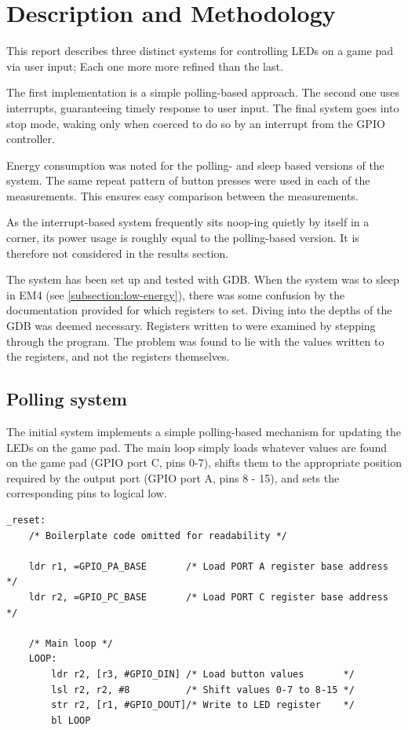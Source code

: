 \section{Description and Methodology}

This report describes three distinct systems for controlling LEDs on a game pad via user input; Each one more more refined than the last.

The first implementation is a simple polling-based approach. The second one uses interrupts, guaranteeing timely response to user input. The final system goes into stop mode, waking only when coerced to do so by an interrupt from the GPIO controller.

Energy consumption was noted for the polling- and sleep based versions of the system. The same repeat pattern of button presses were used in each of the measurements. This ensures easy comparison between the measurements.

As the interrupt-based system frequently sits noop-ing quietly by itself in a corner, its power usage is roughly equal to the polling-based version. It is therefore not considered in the results section. 

The system has been set up and tested with GDB.
When the system was to sleep in EM4 (see \ref{subsection:low-energy}), there was some confusion by the documentation provided for which registers to set. Diving into the depths of the GDB was deemed necessary.
Registers written to were examined by stepping through the program. The problem was found to lie with the values written to the registers, and not the registers themselves.

\subsection{Polling system}
\label{subsection:polling}

The initial system implements a simple polling-based mechanism for updating the LEDs on the game pad. The main loop simply loads whatever values are found on the game pad (GPIO port C, pins 0-7), shifts them to the appropriate position required by the output port (GPIO port A, pins 8 - 15), and sets the corresponding pins to logical low.

\begin{lstlisting}[caption={Polling loop}, label={lst:polling-loop}]
_reset:
    /* Boilerplate code omitted for readability */

    ldr r1, =GPIO_PA_BASE       /* Load PORT A register base address    */
    ldr r2, =GPIO_PC_BASE       /* Load PORT C register base address    */

    /* Main loop */
    LOOP:
        ldr r2, [r3, #GPIO_DIN] /* Load button values       */
        lsl r2, r2, #8          /* Shift values 0-7 to 8-15 */
        str r2, [r1, #GPIO_DOUT]/* Write to LED register    */
        bl LOOP

\end{lstlisting}

